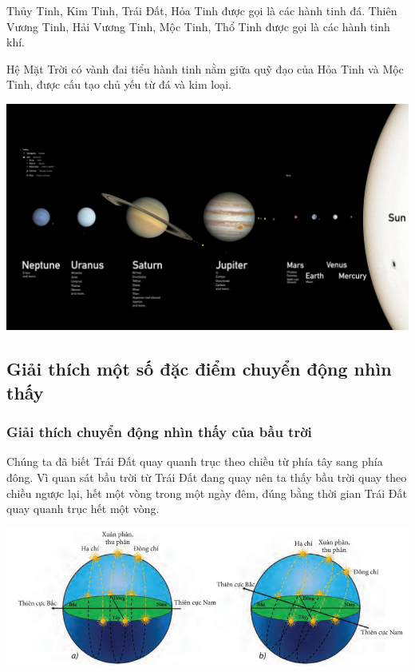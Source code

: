Thủy Tinh, Kim Tinh, Trái Đất, Hỏa Tinh được gọi là các hành tinh đá. Thiên Vương Tinh, Hải Vương Tinh, Mộc Tinh, Thổ Tinh được gọi là các hành tinh khí.

Hệ Mặt Trời có vành đai tiểu hành tinh nằm giữa quỹ đạo của Hỏa Tinh và Mộc Tinh, được cấu tạo chủ yếu từ đá và kim loại.

\begin{center}
	\includegraphics[scale=0.1]{../figs/G10-034-2.jpg}
\end{center}

\subsection{Giải thích một số đặc điểm chuyển động nhìn thấy}
\subsubsection{Giải thích chuyển động nhìn thấy của bầu trời}
Chúng ta đã biết Trái Đất quay quanh trục theo chiều từ phía tây sang phía đông. Vì quan sát bầu trời từ Trái Đất đang quay nên ta thấy bầu trời quay theo chiều ngược lại, hết một vòng trong một ngày đêm, đúng bằng thời gian Trái Đất quay quanh trục hết một vòng.

\begin{center}
	\includegraphics[scale=0.9]{../figs/G10-034-3.png}
\end{center}

